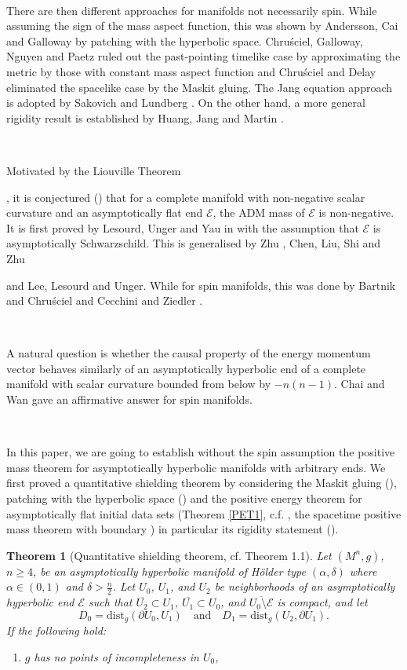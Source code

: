 \documentclass[11pt]{amsart}
\newcommand{\dist}{\mathrm{dist}}
\newtheorem{thm}{Theorem}[section]
\theoremstyle{remark}
\numberwithin{equation}{section}
\def\a{{\alpha}}
\def\d{\frac {\operatorname d}{\operatorname {dt}}}
\def\d{\delta}
\def\mE{\mathcal{E}}
\def\mE{\mathcal{E}}
\begin{document}
\

There are then different approaches for manifolds not necessarily spin. While assuming the sign of the mass aspect function, this was shown by Andersson, Cai and Galloway \cite{ACG} by patching with the hyperbolic space. Chruściel, Galloway, Nguyen and Paetz \cite{CGNP18} ruled out the past-pointing timelike case by approximating the metric by those with constant mass aspect function and Chruściel and Delay \cite{CD19} eliminated the spacelike case by the Maskit gluing. The Jang equation \cite{SY2} approach is adopted by Sakovich \cite{S} and Lundberg \cite{L}. On the other hand, a more general rigidity result is established by Huang, Jang and Martin \cite{HJM}. 

\

Motivated by the Liouville Theorem {\cite{SY4}, it is conjectured (\cite{SY4,SY5}) that for a complete manifold with non-negative scalar curvature and an asymptotically flat end $\mE$, the ADM mass of $\mE$ is non-negative. It is first proved by Lesourd, Unger and Yau in \cite{LUY21} with the assumption that $\mE$ is asymptotically Schwarzschild. This is generalised by Zhu {\cite{Zhu}}, Chen, Liu, Shi and Zhu {\cite{CLSZ} and Lee, Lesourd and Unger\cite{LLU22}. While for spin manifolds, this was done by Bartnik and Chruściel \cite{BC} and Cecchini and Ziedler \cite{CZ}. 

\

A natural question is whether the causal property of the energy momentum vector behaves similarly of an asymptotically hyperbolic end of a complete manifold with scalar curvature bounded from below by $-n(n-1)$. Chai and Wan \cite{CW} gave an affirmative answer for spin manifolds. 

\

In this paper, we are going to establish without the spin assumption the positive mass theorem for asymptotically hyperbolic manifolds with arbitrary ends. We first proved a quantitative shielding theorem by considering the Maskit gluing (\cite{CD19}), patching with the hyperbolic space (\cite{ACG}) and the positive energy theorem for asymptotically flat initial data sets (Theorem \ref{PET1},  c.f. \cite{SY2, E3},  the spacetime positive mass theorem with boundary \cite{GL, LLU21}) in particular its rigidity statement (\cite{HSY}).   

\begin{thm}[Quantitative shielding theorem, cf. \cite{LLU22} Theorem 1.1]\label{QST} 
Let $(M^n,g)$, $n \ge 4$, be an asymptotically hyperbolic manifold of H\"older type $(\a,\d)$ where $\a\in(0,1)$ and $\delta>\frac{n}{2}$. Let $U_0$, $U_1$, and $U_2$ be neighborhoods of an asymptotically hyperbolic end $\mathcal E$ such that  $\overline{U_2}\subset U_1$, $\overline{U_1}\subset U_0$, and $\overline {U_0 \setminus \mathcal E}$ is compact,
and let 
$$D_0=\dist_g(\partial U_0, U_1)\quad\text{and}\quad
D_1 =\dist_g(U_2,\partial U_1).$$
If the following hold:
\begin{enumerate}
    \item $g$ has no points of incompleteness in $U_0$, 
    

\end{enumerate}
\end{thm}}}
\end{document}
